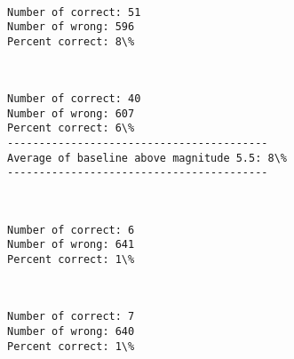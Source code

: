 \documentclass[11pt]{article}
\begin{document}
    \begin{center}
    \end{center}
    { \hspace*{\fill} \\}
    
    \begin{Verbatim}[commandchars=\\\{\}]
Number of correct: 51
Number of wrong: 596
Percent correct: 8\%

    \end{Verbatim}

    \begin{center}
    \end{center}
    { \hspace*{\fill} \\}
    
    \begin{Verbatim}[commandchars=\\\{\}]
Number of correct: 40
Number of wrong: 607
Percent correct: 6\%
-----------------------------------------
Average of baseline above magnitude 5.5: 8\%
-----------------------------------------

    \end{Verbatim}

    \begin{center}
    \end{center}
    { \hspace*{\fill} \\}
    
    \begin{Verbatim}[commandchars=\\\{\}]
Number of correct: 6
Number of wrong: 641
Percent correct: 1\%

    \end{Verbatim}

    \begin{center}
    \end{center}
    { \hspace*{\fill} \\}
    
    \begin{Verbatim}[commandchars=\\\{\}]
Number of correct: 7
Number of wrong: 640
Percent correct: 1\%

    \end{Verbatim}
\end{document}

